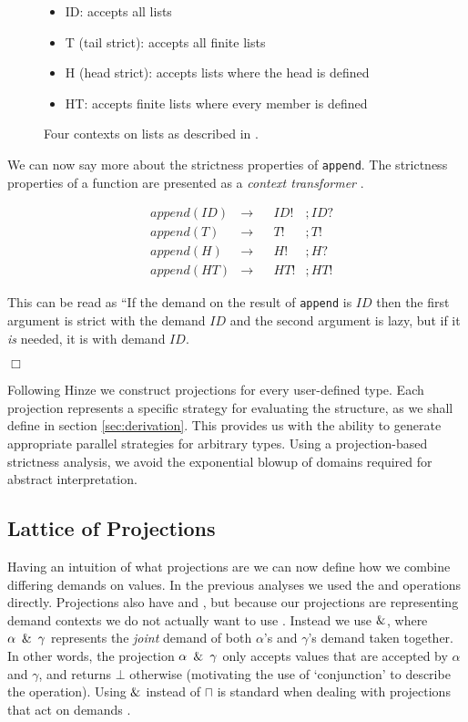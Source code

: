 \begin{figure}[h!]
\begin{itemize}
    \item[] \<ID\>: accepts all lists
    \item[] \<T\> (tail strict): accepts all finite lists
    \item[] \<H\> (head strict): accepts lists where the head is defined
    \item[] \<HT\>: accepts finite lists where every member is defined
\end{itemize}
\caption[Projections for the 4-point Domain]{Four contexts on lists as described in \citep{wadler1987projections}.}
\label{fig:listContexts}
\end{figure}

We can now say more about the strictness properties of \verb'append'. The
strictness properties of a function are presented as a \emph{context
transformer} \citep{hinze1995projection}. 

\begin{align*}
    &append(ID) &\rightarrow &&ID!&;ID? \\
    &append(T)  &\rightarrow &&T!&;T! \\
    &append(H)  &\rightarrow &&H!&;H? \\
    &append(HT) &\rightarrow &&HT!&;HT!
\end{align*}

This can be read as ``If the demand on the result of \verb-append- is $ID$
then the first argument is strict with the demand $ID$ and the second
argument is lazy, but if it \emph{is} needed, it is with demand $ID$.

\hfill$\Box$

Following Hinze \citep{hinze1995projection} we construct projections
for every user-defined type. Each projection represents a
specific strategy for evaluating the structure, as we shall define in section
\ref{sec:derivation}. This provides us with the ability to generate
appropriate parallel strategies for arbitrary types. Using a
projection-based strictness analysis, we avoid the exponential blowup
of domains required for abstract interpretation.

\subsection{Lattice of Projections}

Having an intuition  of what projections are we can now define how we combine
differing demands on values. In the previous analyses we used the \meet and
\join operations directly. Projections also have \meet and \join, but because
our projections are representing demand contexts we do not actually want to use
\meet. Instead we use $\operatorname{\&}$, where $\alpha\ \operatorname{\&}\ \gamma$ represents the
\emph{joint} demand of both $\alpha$'s and $\gamma$'s demand taken together. In
other words, the projection $\alpha\ \operatorname{\&}\ \gamma$ only accepts values that
are accepted by $\alpha$ and $\gamma$, and returns $\bot$ otherwise (motivating
the use of `conjunction' to describe the operation). Using $\operatorname{\&}$ instead of
$\sqcap$ is standard when dealing with projections that act on demands
\citep{wadler1987projections, hinze1995projection, SergeyDemand}.

